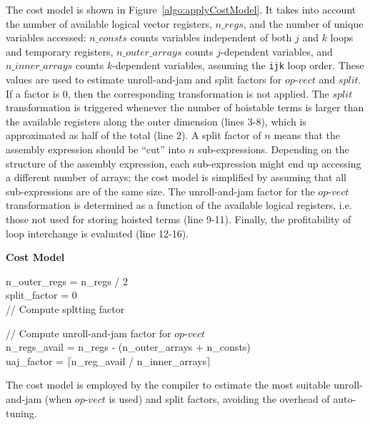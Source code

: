 \documentclass[conference]{IEEEtran}
\begin{document}
The cost model is shown in Figure~\ref{algo:applyCostModel}. It takes into account the number of available logical vector registers, $n\_regs$, and the number of unique variables accessed: $n\_consts$ counts variables independent of both $j$ and $k$ loops and temporary registers, $n\_outer\_arrays$ counts $j$-dependent variables, and $n\_inner\_arrays$ counts $k$-dependent variables, assuming the \texttt{ijk} loop order. These values are used to estimate unroll-and-jam and split factors for $op$-$vect$ and $split$. If a factor is 0, then the corresponding transformation is not applied. The $split$ transformation is triggered whenever the number of hoistable terms is larger than the available registers along the outer dimension (lines 3-8), which is approximated as half of the total (line 2). A split factor of $n$ means that the assembly expression should be ``cut'' into $n$ sub-expressions. Depending on the structure of the assembly expression, each sub-expression might end up accessing a different number of arrays; the cost model is simplified by assuming that all sub-expressions are of the same size. The unroll-and-jam factor for the $op$-$vect$ transformation is determined as a function of the available logical registers, i.e. those not used for storing hoisted terms (line 9-11). Finally, the profitability of loop interchange is evaluated (line 12-16).


\begin{algorithm}[t]
\label{algo:applyCostModel}
  \textbf{Cost Model}\\

n\_outer\_regs = n\_regs / 2 \\
split\_factor = 0 \\
// Compute spltting factor \\

// Compute unroll-and-jam factor for $op$-$vect$ \\
n\_regs\_avail = n\_regs - (n\_outer\_arrays + n\_consts)\\
uaj\_factor = $\lceil$n\_reg\_avail / n\_inner\_arrays$\rceil$ \\
\caption{The cost model is employed by the compiler to estimate the most suitable unroll-and-jam (when $op$-$vect$ is used) and split factors, avoiding the overhead of auto-tuning.}
\end{algorithm}
\end{document}
